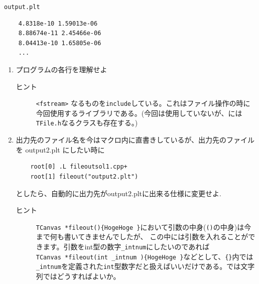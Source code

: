 \documentclass{jarticle}
\begin{document}
 \begin{itembox}{\texttt{output.plt}}
\begin{verbatim}
	4.8318e-10 1.59013e-06 
	8.88674e-11 2.45466e-06 
	8.04413e-10 1.65805e-06 
	...
\end{verbatim}
 \end{itembox}


 \begin{enumerate}
  \item プログラムの各行を理解せよ
	\begin{description}
	 \item[ヒント] \verb|<fstream>| なるものを\verb|include|している。これはファイル操作の時に今回使用するライブラリである。(今回は使用していないが、\ROOT には\verb|TFile.h|なるクラスも存在する。)
	\end{description}

  \item 出力先のファイル名を今はマクロ内に直書きしているが、出力先のファイルを output2.plt にしたい時に
\begin{verbatim}
	root[0] .L fileoutsol1.cpp+
	root[1] fileout("output2.plt") 
\end{verbatim}
	としたら、自動的に出力先がoutput2.pltに出来る仕様に変更せよ.
	\begin{description}
	 \item[ヒント]  \verb|TCanvas *fileout(){HogeHoge }|において引数の中身(\verb|()|の中身)は今まで何も書いてきませんでしたが、
		    この中には引数を入れることができます。引数をint型の数字\verb|_intnum|にしたいのであれば \\ \verb|TCanvas *fileout(int _intnum ){HogeHoge }|などとして、\verb|{}|内では\verb|_intnum|を定義された\verb|int|型数字だと扱えばいいだけである。では文字列ではどうすればよいか。

	\end{description}
 \end{enumerate}
\end{document}
